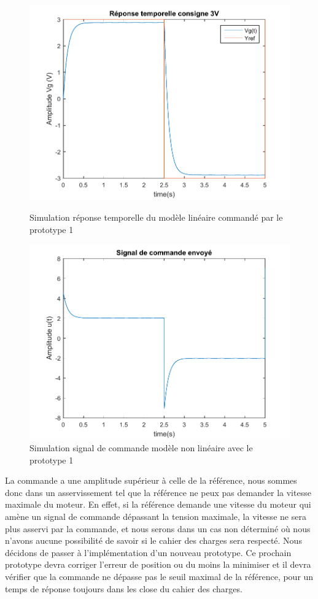 \begin{figure}[!ht]
\begin{minipage}{.5\textwidth}
\includegraphics[width= .8\textwidth]{./IV/images/repNL_proto1.pdf}
\caption{Simulation réponse temporelle du modèle linéaire commandé par le prototype 1\label{fig:repNL_proto1} }
\end{minipage}
\begin{minipage}{.5\textwidth}
\includegraphics[width = .8\textwidth]{./IV/images/comNLproto1.pdf}
\caption{Simulation signal de commande modèle non linéaire avec le prototype 1\label{fig:comNL_proto1}}
\end{minipage}
\end{figure}  
La commande a une amplitude supérieur à celle de la référence, nous sommes donc dans un asservissement tel que la référence ne peux pas demander la vitesse maximale du moteur. En effet, si la référence demande une vitesse du moteur qui amène un signal de commande dépassant la tension maximale, la vitesse ne sera plus asservi par la commande, et nous serons dans un cas non déterminé où nous n'avons aucune possibilité de savoir si le cahier des charges sera respecté.
Nous décidons de passer à l'implémentation d'un nouveau prototype. Ce prochain prototype devra corriger l'erreur de position ou du moins la minimiser et il devra vérifier que la commande ne dépasse pas le seuil maximal de la référence, pour un temps de réponse toujours dans les close du cahier des charges.

